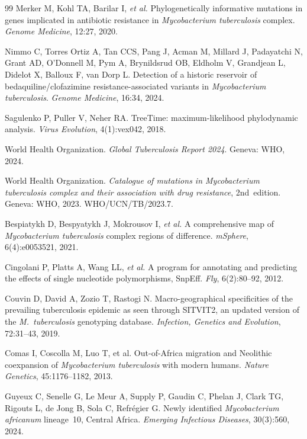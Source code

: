\documentclass[11pt,a4paper]{article}
\begin{document}
\begin{thebibliography}{99}
	Merker M, Kohl TA, Barilar I, \textit{et al.}
	Phylogenetically informative mutations in genes implicated in antibiotic
	resistance in \textit{Mycobacterium tuberculosis} complex.
	\textit{Genome Medicine}, 12:27, 2020.

	Nimmo C, Torres Ortiz A, Tan CCS, Pang J, Acman M, Millard J,
	Padayatchi N, Grant AD, O'Donnell M, Pym A, Brynildsrud OB,
	Eldholm V, Grandjean L, Didelot X, Balloux F, van Dorp L.
	Detection of a historic reservoir of bedaquiline/clofazimine
	resistance-associated variants in \textit{Mycobacterium tuberculosis}.
	\textit{Genome Medicine}, 16:34, 2024.

	Sagulenko P, Puller V, Neher RA.
	TreeTime: maximum-likelihood phylodynamic analysis.
	\textit{Virus Evolution}, 4(1):vex042, 2018.

	World Health Organization.
	\textit{Global Tuberculosis Report 2024}.
	Geneva: WHO, 2024.

	World Health Organization.
	\textit{Catalogue of mutations in Mycobacterium tuberculosis complex and
	their association with drug resistance}, 2nd~edition.
	Geneva: WHO, 2023.
	WHO/UCN/TB/2023.7.

	Bespiatykh D, Bespyatykh J, Mokrousov I, \textit{et al.}
	A comprehensive map of \textit{Mycobacterium tuberculosis} complex regions of difference.
	\textit{mSphere}, 6(4):e0053521, 2021.

	Cingolani P, Platts A, Wang LL, \textit{et al.}
	A program for annotating and predicting the effects of single nucleotide
	polymorphisms, SnpEff.
	\textit{Fly}, 6(2):80--92, 2012.


	Couvin D, David A, Zozio T, Rastogi N.
	Macro-geographical specificities of the prevailing tuberculosis epidemic
	as seen through SITVIT2, an updated version of the
	\textit{M.~tuberculosis} genotyping database.
	\textit{Infection, Genetics and Evolution}, 72:31--43, 2019.


	Comas I, Coscolla M, Luo T, et al.
	Out-of-Africa migration and Neolithic coexpansion of
	\textit{Mycobacterium tuberculosis} with modern humans.
	\textit{Nature Genetics}, 45:1176--1182, 2013.

	Guyeux C, Senelle G, Le Meur A, Supply P, Gaudin C, Phelan J, Clark TG,
	Rigouts L, de Jong B, Sola C, Refr\'egier G.
	Newly identified \textit{Mycobacterium africanum} lineage~10, Central Africa.
	\textit{Emerging Infectious Diseases}, 30(3):560, 2024.


\end{thebibliography}
\end{document}
